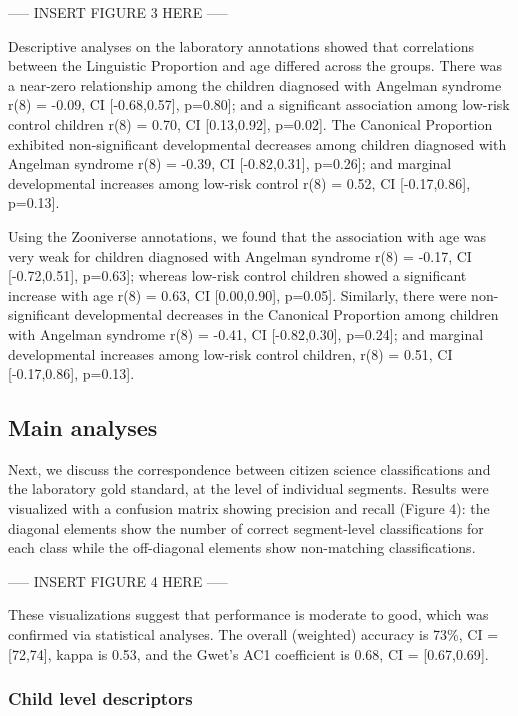 \documentclass[english,,man]{apa6}
\begin{document}
----- INSERT FIGURE 3 HERE -----

Descriptive analyses on the laboratory annotations showed that correlations between the Linguistic Proportion and age differed across the groups. There was a near-zero relationship among the children diagnosed with Angelman syndrome r(8) = -0.09, CI {[}-0.68,0.57{]}, p=0.80{]}; and a significant association among low-risk control children r(8) = 0.70, CI {[}0.13,0.92{]}, p=0.02{]}. The Canonical Proportion exhibited non-significant developmental decreases among children diagnosed with Angelman syndrome r(8) = -0.39, CI {[}-0.82,0.31{]}, p=0.26{]}; and marginal developmental increases among low-risk control r(8) = 0.52, CI {[}-0.17,0.86{]}, p=0.13{]}.

Using the Zooniverse annotations, we found that the association with age was very weak for children diagnosed with Angelman syndrome r(8) = -0.17, CI {[}-0.72,0.51{]}, p=0.63{]}; whereas low-risk control children showed a significant increase with age r(8) = 0.63, CI {[}0.00,0.90{]}, p=0.05{]}. Similarly, there were non-significant developmental decreases in the Canonical Proportion among children with Angelman syndrome r(8) = -0.41, CI {[}-0.82,0.30{]}, p=0.24{]}; and marginal developmental increases among low-risk control children, r(8) = 0.51, CI {[}-0.17,0.86{]}, p=0.13{]}.

\hypertarget{main-analyses}{%
\subsection{Main analyses}\label{main-analyses}}

Next, we discuss the correspondence between citizen science classifications and the laboratory gold standard, at the level of individual segments. Results were visualized with a confusion matrix showing precision and recall (Figure 4): the diagonal elements show the number of correct segment-level classifications for each class while the off-diagonal elements show non-matching classifications.

----- INSERT FIGURE 4 HERE -----

These visualizations suggest that performance is moderate to good, which was confirmed via statistical analyses. The overall (weighted) accuracy is 73\%, CI = {[}72,74{]}, kappa is 0.53, and the Gwet's AC1 coefficient is 0.68, CI = {[}0.67,0.69{]}.

\hypertarget{child-level-descriptors}{%
\subsubsection{Child level descriptors}\label{child-level-descriptors}}
\end{document}
